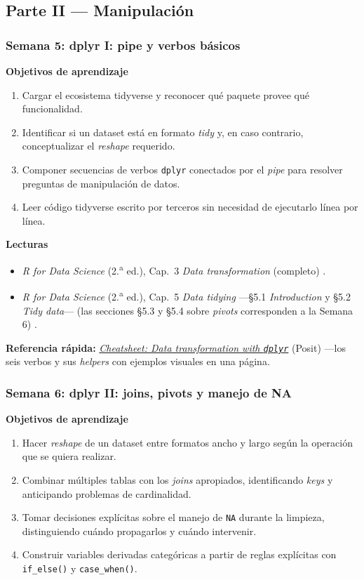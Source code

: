 \documentclass[11pt,letterpaper]{article}
\newcommand{\semana}[2]{%
  \subsubsection*{\color{main}Semana #1: #2}%
}
\newcommand{\cheatsheet}[2]{%
  \href{https://rstudio.github.io/cheatsheets/#1.pdf}{\textit{Cheatsheet: #2}}%
}
\begin{document}
\subsection*{\color{main}Parte II --- Manipulación}

\semana{5}{dplyr I: pipe y verbos básicos}

\medskip
\noindent\textbf{Objetivos de aprendizaje}
\begin{enumerate}[leftmargin=*, itemsep=1pt]
    \item Cargar el ecosistema tidyverse y reconocer qué paquete provee qué funcionalidad.
    \item Identificar si un dataset está en formato \textit{tidy} y, en caso contrario, conceptualizar el \textit{reshape} requerido.
    \item Componer secuencias de verbos \texttt{dplyr} conectados por el \textit{pipe} para resolver preguntas de manipulación de datos.
    \item Leer código tidyverse escrito por terceros sin necesidad de ejecutarlo línea por línea.
\end{enumerate}

\medskip
\noindent\textbf{Lecturas}
\begin{itemize}[leftmargin=*, itemsep=1pt]
    \item \textit{R for Data Science} (2.\textsuperscript{a} ed.), Cap.\ 3 \textit{Data transformation} (completo) \cite{wickham2023r4ds}.
    \item \textit{R for Data Science} (2.\textsuperscript{a} ed.), Cap.\ 5 \textit{Data tidying} ---§5.1 \textit{Introduction} y §5.2 \textit{Tidy data}--- (las secciones §5.3 y §5.4 sobre \textit{pivots} corresponden a la Semana 6) \cite{wickham2023r4ds}.
\end{itemize}

\medskip
\noindent\textbf{Referencia rápida:} \cheatsheet{data-transformation}{Data transformation with \texttt{dplyr}} (Posit) ---los seis verbos y sus \textit{helpers} con ejemplos visuales en una página.

\semana{6}{dplyr II: joins, pivots y manejo de NA}

\medskip
\noindent\textbf{Objetivos de aprendizaje}
\begin{enumerate}[leftmargin=*, itemsep=1pt]
    \item Hacer \textit{reshape} de un dataset entre formatos ancho y largo según la operación que se quiera realizar.
    \item Combinar múltiples tablas con los \textit{joins} apropiados, identificando \textit{keys} y anticipando problemas de cardinalidad.
    \item Tomar decisiones explícitas sobre el manejo de \texttt{NA} durante la limpieza, distinguiendo cuándo propagarlos y cuándo intervenir.
    \item Construir variables derivadas categóricas a partir de reglas explícitas con \texttt{if\_else()} y \texttt{case\_when()}.
\end{enumerate}
\end{document}
